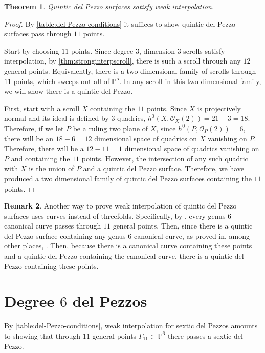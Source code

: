 \documentclass[reqno, 11pt]{amsart}
\theoremstyle{definition}
\theoremstyle{remark}
\numberwithin{equation}{section}
\numberwithin{thm}{section}
\numberwithin{prop}{section}
\numberwithin{lem}{section}
\numberwithin{cor}{section}
\numberwithin{conj}{section}
\numberwithin{defn}{section}
\theoremstyle{plain}
\newtheorem{theorem}{Theorem}[section]
\theoremstyle{definition}
\newtheorem{remark}[theorem]{Remark}
\newcommand\bp{{\mathbb P}}
\newcommand\sco{\mathscr O}
\begin{document}
\label{sec:degree-5}
\begin{theorem}
	\label{thm:quinticDPinterpolation}
	Quintic del Pezzo surfaces satisfy
	weak interpolation.
\end{theorem}
\begin{proof}
	By \autoref{table:del-Pezzo-conditions}	it suffices to show quintic del Pezzo surfaces pass through $11$ points.
	
	Start by choosing $11$ points.
	Since degree $3$, dimension $3$	scrolls satisfy interpolation,
	by \autoref{thm:stronginterpscroll},
	there is such a scroll through any $12$ general points.
	Equivalently, there is a two dimensional family of scrolls
	through $11$ points, which sweeps out all of $\bp^5$.
	In any scroll in this two dimensional family, we will show
	there is a quintic del Pezzo.

	First, start with a scroll $X$ containing the $11$ points.
	Since $X$ is projectively normal and its ideal is defined by
	$3$ quadrics, $h^0(X, \sco_X(2)) = 21 - 3 = 18.$
	Therefore, if we let $P$ be a ruling two plane of $X$,
	since $h^0(P, \sco_P(2)) = 6$, there will be an $18 - 6 = 12$
	dimensional space of quadrics on $X$ vanishing on $P$.
	Therefore, there will be a $12 - 11 = 1$ dimensional
	space of quadrics vanishing on $P$ and containing the $11$ points.
	However, the intersection of any such quadric with $X$
	is the union of $P$ and a quintic del Pezzo surface. 
	Therefore, we have produced a two dimensional family of
	quintic del Pezzo surfaces containing the $11$ points.
	\end{proof}


\begin{remark}
	\label{remark:}
	Another way to prove weak interpolation of quintic del Pezzo
	surfaces uses curves instead of threefolds.
	Specifically, by \cite[Corollary 6]{stevens:on-the-number-of-points-determining-a-canonical-curve}, every genus $6$ canonical curve passes through
	$11$ general points. Then, since there is a quintic del Pezzo
	surface containing any genus 6 canonical curve,
	as proved in, among other places,
	\cite[5.8]{arbarelloH:canonical-curves-and-quadrics-of-rank-4}.
	Then, because there is a canonical curve containing these points
	and a quintic del Pezzo containing the canonical curve,
	there is a quintic del Pezzo containing these points.
\end{remark}





\section{Degree $6$ del Pezzos}
\label{sec:degree-6}
By \autoref{table:del-Pezzo-conditions}, weak interpolation for sextic del Pezzos amounts to showing that through $11$ general points $\Gamma_{11} \subset \bp^{6}$ there passes a sextic del Pezzo. 
\end{document}
